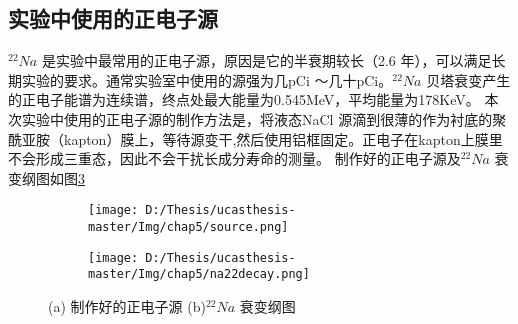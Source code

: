  \subsection{实验中使用的正电子源}
$^{22}Na$ 是实验中最常用的正电子源，原因是它的半衰期较长（2.6 年），可以满足长期实验的要求。通常实验室中使用的源强为几pCi ～几十pCi。$^{22}Na$ 贝塔衰变产生的正电子能谱为连续谱，终点处最大能量为0.545MeV，平均能量为178KeV。 本次实验中使用的正电子源的制作方法是，将液态NaCl 源滴到很薄的作为衬底的聚酰亚胺（kapton）膜上，等待源变干,然后使用铝框固定。正电子在kapton上膜里不会形成三重态，因此不会干扰长成分寿命的测量\citep{monge1994position}。 制作好的正电子源及$^{22}Na$ 衰变纲图如图\ref{fig:p52}
\begin{figure}[!htbp]
  \centering
  \begin{subfigure}[b]{\MySubFactor\textwidth}
    \texttt{[image: D:/Thesis/ucasthesis-master/Img/chap5/source.png]}
    \caption{}
    \label{fig:p52_1}
  \end{subfigure}%
  \quad\quad\quad\quad\quad\quad%
  \begin{subfigure}[b]{\MySubFactor\textwidth}
    \texttt{[image: D:/Thesis/ucasthesis-master/Img/chap5/na22decay.png]}
    \caption{}
    \label{fig:p52_2}
  \end{subfigure}
  \caption{(a) 制作好的正电子源 (b)$^{22}Na$ 衰变纲图}
  \label{fig:p52}
\end{figure}
